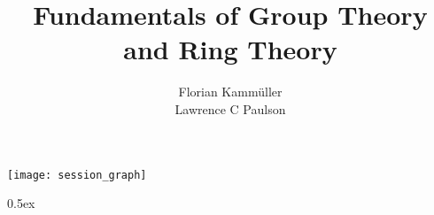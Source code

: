 \documentclass[a4paper]{article}
\begin{document}
\title{Fundamentals of Group Theory and Ring Theory}
\author{Florian Kamm{{\"u}}ller\\ Lawrence C Paulson}
\maketitle

\tableofcontents

\begin{center}
  \texttt{[image: session\_graph]}  
\end{center}

\newpage

\parindent 0pt\parskip 0.5ex

\end{document}
